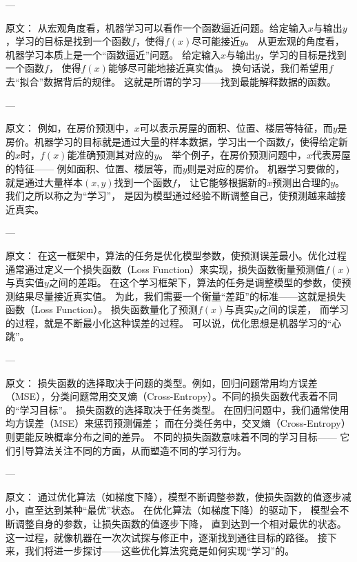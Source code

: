 ---

原文：
从宏观角度看，机器学习可以看作一个函数逼近问题。给定输入$x$与输出$y$，学习的目标是找到一个函数$f$，使得$f(x)$尽可能接近$y$。
从更宏观的角度看，机器学习本质上是一个“函数逼近”问题。  
给定输入$x$与输出$y$，学习的目标是找到一个函数$f$，  
使得$f(x)$能够尽可能地接近真实值$y$。  
换句话说，我们希望用$f$去“拟合”数据背后的规律。  
这就是所谓的学习——找到最能解释数据的函数。

---

原文：
例如，在房价预测中，$x$可以表示房屋的面积、位置、楼层等特征，而$y$是房价。机器学习的目标就是通过大量的样本数据，学习出一个函数$f$，使得给定新的$x$时，$f(x)$能准确预测其对应的$y$。
举个例子，在房价预测问题中，$x$代表房屋的特征——  
例如面积、位置、楼层等，而$y$则是对应的房价。  
机器学习要做的，就是通过大量样本$(x, y)$找到一个函数$f$，  
让它能够根据新的$x$预测出合理的$y$。  
我们之所以称之为“学习”，  
是因为模型通过经验不断调整自己，使预测越来越接近真实。

---

原文：
在这一框架中，算法的任务是优化模型参数，使预测误差最小。优化过程通常通过定义一个损失函数（Loss Function）来实现，损失函数衡量预测值$f(x)$与真实值$y$之间的差距。
在这个学习框架下，算法的任务是调整模型的参数，使预测结果尽量接近真实值。  
为此，我们需要一个衡量“差距”的标准——这就是损失函数（Loss Function）。  
损失函数量化了预测$f(x)$与真实$y$之间的误差，  
而学习的过程，就是不断最小化这种误差的过程。  
可以说，优化思想是机器学习的“心跳”。

---

原文：
损失函数的选择取决于问题的类型。例如，回归问题常用均方误差（MSE），分类问题常用交叉熵（Cross-Entropy）。不同的损失函数代表着不同的“学习目标”。
损失函数的选择取决于任务类型。  
在回归问题中，我们通常使用均方误差（MSE）来惩罚预测偏差；  
而在分类任务中，交叉熵（Cross-Entropy）则更能反映概率分布之间的差异。  
不同的损失函数意味着不同的学习目标——  
它们引导算法关注不同的方面，从而塑造不同的学习行为。

---

原文：
通过优化算法（如梯度下降），模型不断调整参数，使损失函数的值逐步减小，直至达到某种“最优”状态。
在优化算法（如梯度下降）的驱动下，  
模型会不断调整自身的参数，让损失函数的值逐步下降，  
直到达到一个相对最优的状态。  
这一过程，就像机器在一次次试探与修正中，逐渐找到通往目标的路径。  
接下来，我们将进一步探讨——这些优化算法究竟是如何实现“学习”的。

